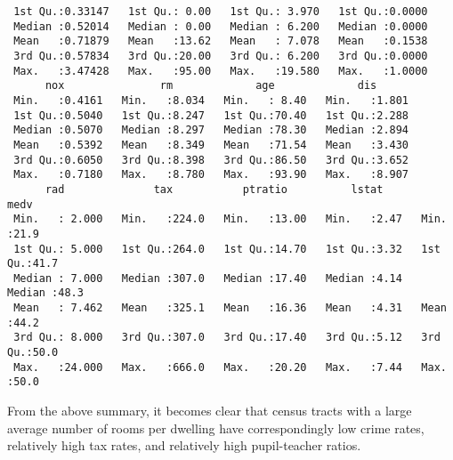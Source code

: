 \begin{itemize}
\begin{verbatim}
 1st Qu.:0.33147   1st Qu.: 0.00   1st Qu.: 3.970   1st Qu.:0.0000
 Median :0.52014   Median : 0.00   Median : 6.200   Median :0.0000
 Mean   :0.71879   Mean   :13.62   Mean   : 7.078   Mean   :0.1538
 3rd Qu.:0.57834   3rd Qu.:20.00   3rd Qu.: 6.200   3rd Qu.:0.0000
 Max.   :3.47428   Max.   :95.00   Max.   :19.580   Max.   :1.0000
      nox               rm             age             dis
 Min.   :0.4161   Min.   :8.034   Min.   : 8.40   Min.   :1.801
 1st Qu.:0.5040   1st Qu.:8.247   1st Qu.:70.40   1st Qu.:2.288
 Median :0.5070   Median :8.297   Median :78.30   Median :2.894
 Mean   :0.5392   Mean   :8.349   Mean   :71.54   Mean   :3.430
 3rd Qu.:0.6050   3rd Qu.:8.398   3rd Qu.:86.50   3rd Qu.:3.652
 Max.   :0.7180   Max.   :8.780   Max.   :93.90   Max.   :8.907
      rad              tax           ptratio          lstat           medv
 Min.   : 2.000   Min.   :224.0   Min.   :13.00   Min.   :2.47   Min.   :21.9
 1st Qu.: 5.000   1st Qu.:264.0   1st Qu.:14.70   1st Qu.:3.32   1st Qu.:41.7
 Median : 7.000   Median :307.0   Median :17.40   Median :4.14   Median :48.3
 Mean   : 7.462   Mean   :325.1   Mean   :16.36   Mean   :4.31   Mean   :44.2
 3rd Qu.: 8.000   3rd Qu.:307.0   3rd Qu.:17.40   3rd Qu.:5.12   3rd Qu.:50.0
 Max.   :24.000   Max.   :666.0   Max.   :20.20   Max.   :7.44   Max.   :50.0
    \end{verbatim}\normalsize
    From the above summary, it becomes clear that census tracts with a large 
    average number of rooms per dwelling have correspondingly low crime rates,
    relatively high tax rates, and relatively high pupil-teacher ratios.
\end{itemize}
